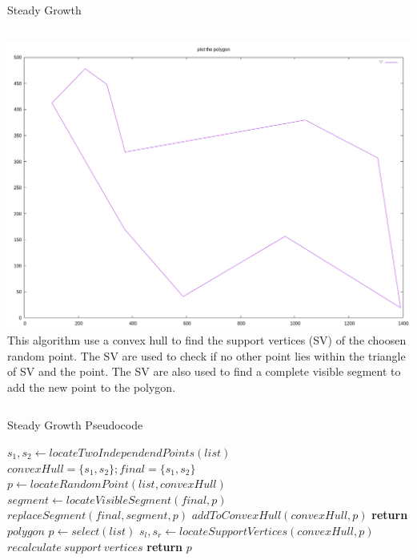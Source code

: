 \documentclass{beamer}
\begin{document}
\begin{frame}{Steady Growth}
  \begin{block}{}
    \begin{columns}[onlytextwidth,T]
      \column{\dimexpr\linewidth-40mm}
      \includegraphics[width=0.5\paperwidth]{figures/kk-steady-growth-10-0-0.png}
      \column{40mm}
      This algorithm use a convex hull to find the support vertices (SV) of the choosen
      random point. The SV are used to check if no other point lies within the
      triangle of SV and the point. The SV are also used to find a complete
      visible segment to add the new point to the polygon.
    \end{columns}
  \end{block}
\end{frame}

\begin{frame}{Steady Growth Pseudocode}
  \begin{algorithm}[H]
    \scriptsize
    \begin{algorithmic}[0]
        \State $s_1, s_2 \gets locateTwoIndependendPoints(list)$
        \State $convexHull = \{s_1, s_2\}; final = \{s_1, s_2\}$
          \State $p \gets locateRandomPoint(list, convexHull)$
          \State $segment \gets locateVisibleSegment(final, p)$
          \State $replaceSegment(final, segment, p)$
          \State $addToConvexHull(convexHull, p)$
        \EndFor
        \State \textbf{return} $polygon$
      \EndProcedure
      \vspace{3pt}
        \State $p \gets select(list)$
        \State $s_l, s_r \gets locateSupportVertices(convexHull, p)$
            \State $recalculate\ support\ vertices$
          \EndIf
        \EndFor
        \State \textbf{return} $p$
      \EndProcedure
    \end{algorithmic}
  \end{algorithm}
\end{frame}
\end{document}
